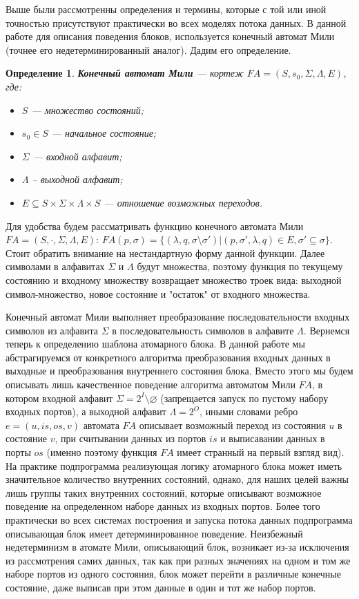 \documentclass[10pt,a4paper]{article}
\newtheorem{defen}{Определение}
\newcommand{\FA}{F\!A}
\begin{document}
Выше были рассмотренны определения и термины, которые с той или иной точностью присутствуют практически во всех моделях потока данных.
В данной работе для описания поведения блоков, используется конечный автомат Мили (точнее его недетерминированный аналог). Дадим его определение.

\begin{defen}
  \textbf{Конечный автомат Мили} --- кортеж $\FA = (S, s_0, \Sigma, \Lambda, E)$, где:
  \begin{itemize}
    \item $S$ --- множество состояний;
    \item $s_0 \in S$ --- начальное состояние;
    \item $\Sigma$ --- входной алфавит;
    \item $\Lambda$ -- выходной алфавит;
    \item $E \subseteq S \times \Sigma \times \Lambda \times S$ --- отношение возможных переходов.
  \end{itemize}
\end{defen}

Для удобства будем рассматривать функцию конечного автомата Мили $\FA = (S, \cdot, \Sigma, \Lambda, E)$:
$\FA(p, \sigma) = \{(\lambda, q, \sigma \setminus \sigma') \vert (p, \sigma', \lambda, q) \in E, \sigma' \subseteq \sigma\}$. Стоит обратить внимание на нестандартную форму данной функции. Далее символами в алфавитах $\Sigma$ и $\Lambda$ будут множества, поэтому функция по текущему состоянию и входному множеству возвращает множество троек вида:
выходной символ-множество, новое состояние и "остаток" от входного множества.

Конечный автомат Мили выполняет преобразование последовательности входных символов из алфавита $\Sigma$ в последовательность символов в алфавите $\Lambda$.
Вернемся теперь к определению шаблона атомарного блока. В данной работе мы абстрагируемся от конкретного алгоритма преобразования входных данных в выходные
и преобразования внутреннего состояния блока. Вместо этого мы будем описывать лишь качественное поведение алгоритма автоматом Мили $\FA$, в котором входной алфавит
$\Sigma = 2^I \setminus \varnothing$ (запрещается запуск по пустому набору входных портов), а выходной алфавит $\Lambda = 2^O$, иными словами ребро $e = (u, is, os, v)$ автомата $\FA$ описывает возможный переход из состояния $u$ в состояние $v$,
при считывании данных из портов $is$ и выписавании данных в порты $os$ (именно поэтому функция $\FA$ имеет странный на первый взгляд вид).
На практике подпрограмма реализующая логику атомарного блока может иметь значительное количество внутренних состояний,
однако, для наших целей важны лишь группы таких внутренних состояний, которые описывают возможное поведение на определенном наборе данных из входных портов.
Более того практически во всех системах построения и запуска потока данных подпрограмма описывающая блок имеет детерминированное поведение.
Неизбежный недетерминизм в атомате Мили, описывающий блок, возникает из-за исключения из рассмотрения самих данных,
так как при разных значениях на одном и том же наборе портов из одного состояния, блок может перейти в различные конечные состояние,
даже выписав при этом данные в один и тот же набор портов.
\end{document}
